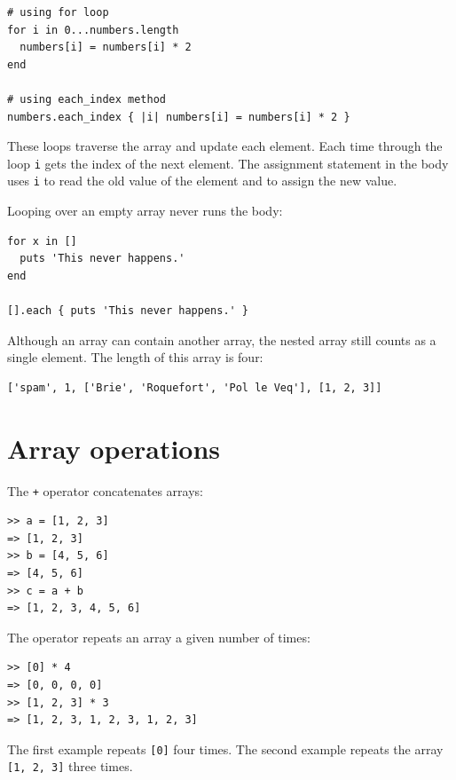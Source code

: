 \documentclass[10pt]{book}
\begin{document}
\begin{verbatim}
# using for loop
for i in 0...numbers.length
  numbers[i] = numbers[i] * 2
end

# using each_index method
numbers.each_index { |i| numbers[i] = numbers[i] * 2 }
\end{verbatim}
%
These loops traverse the array and update each element.
Each time through the loop {\tt i} gets the index
of the next element.  The assignment statement in the body uses
{\tt i} to read the old value of the element and to assign the
new value.

Looping over an empty array never runs the body:

\begin{verbatim}
for x in []
  puts 'This never happens.'
end

[].each { puts 'This never happens.' }
\end{verbatim}
%
Although an array can contain another array, the nested
array still counts as a single element.  The length of this array is
four:

\begin{verbatim}
['spam', 1, ['Brie', 'Roquefort', 'Pol le Veq'], [1, 2, 3]]
\end{verbatim}



\section{Array operations}
\label{arrayoperation}

The {\tt +} operator concatenates arrays:

\begin{verbatim}
>> a = [1, 2, 3]
=> [1, 2, 3]
>> b = [4, 5, 6]
=> [4, 5, 6]
>> c = a + b
=> [1, 2, 3, 4, 5, 6]
\end{verbatim}
%
The {\tt *} operator repeats an array a given number of times:

\begin{verbatim}
>> [0] * 4
=> [0, 0, 0, 0]
>> [1, 2, 3] * 3
=> [1, 2, 3, 1, 2, 3, 1, 2, 3]
\end{verbatim}
%
The first example repeats {\tt [0]} four times.  The second example
repeats the array {\tt [1, 2, 3]} three times.
\end{document}
